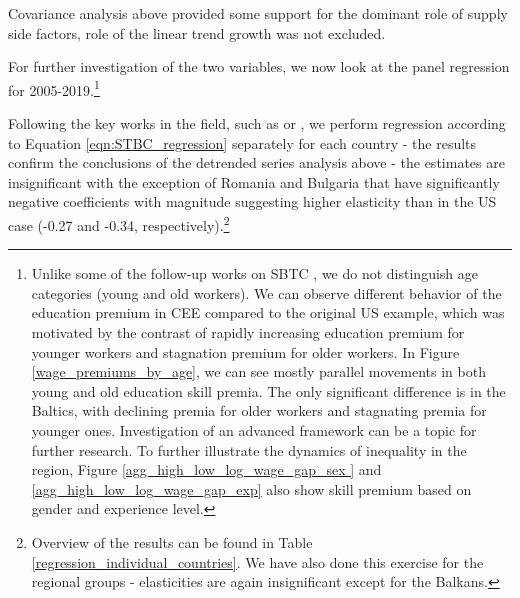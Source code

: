 \documentclass[11pt]{article}
\begin{document}

Covariance analysis above provided some support for the dominant role of supply side factors, role of the linear trend growth was not excluded.



For further investigation of the two variables, we now look at the panel regression for 2005-2019.\footnote{Unlike some of the follow-up works on SBTC \citep{card2001can}, we do not distinguish age categories (young and old workers). We can observe different behavior of the education premium in CEE compared to the original US example, which was motivated by the contrast of rapidly increasing education premium for younger workers and stagnation premium for older workers. In Figure \ref{wage_premiums_by_age}, we can see mostly parallel movements in both young and old education skill premia. The only significant difference is in the Baltics, with declining premia for older workers and stagnating premia for younger ones. Investigation of an advanced framework can be a topic for further research. To further illustrate the dynamics of inequality in the region, Figure \ref{agg_high_low_log_wage_gap_sex } and \ref{agg_high_low_log_wage_gap_exp} also show skill premium based on gender and experience level.}   %

Following the key works in the field, such as \citet{katz1992changes} or \citet{acemoglu2012does}, we perform regression according to Equation \ref{eqn:STBC_regression} separately for each country - the results confirm the conclusions of the detrended series analysis above - the estimates are insignificant with the exception of Romania and Bulgaria that have significantly negative coefficients with magnitude suggesting higher elasticity than in the US case (-0.27 and -0.34, respectively).\footnote{Overview of the results can be found in Table \ref{regression_individual_countries}. We have also done this exercise for the regional groups - elasticities are again insignificant except for the Balkans.}
\end{document}

